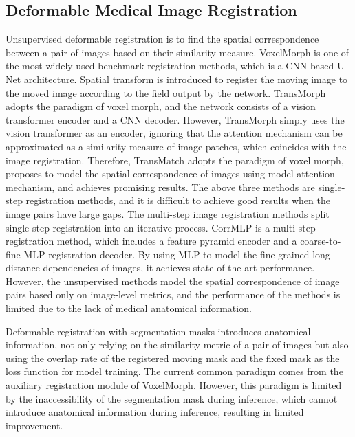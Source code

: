\subsection{Deformable Medical Image Registration}
Unsupervised deformable registration is to find the spatial correspondence between a pair of images based on their similarity measure.
VoxelMorph \cite{VoxelMorph} is one of the most widely used benchmark registration methods, which is a CNN-based U-Net architecture. Spatial transform is introduced to register the moving image to the moved image according to the field output by the network. 
TransMorph \cite{TransMorph} adopts the paradigm of voxel morph, and the network consists of a vision transformer encoder and a CNN decoder. However, TransMorph simply uses the vision transformer as an encoder, ignoring that the attention mechanism can be approximated as a similarity measure of image patches, which coincides with the image registration. Therefore, TransMatch \cite{TransMatch} adopts the paradigm of voxel morph, proposes to model the spatial correspondence of images using model attention mechanism, and achieves promising results.
The above three methods are single-step registration methods, and it is difficult to achieve good results when the image pairs have large gaps. The multi-step image registration methods split single-step registration into an iterative process. CorrMLP \cite{CorrMLP} is a multi-step registration method, which includes a feature pyramid encoder and a coarse-to-fine MLP registration decoder. By using MLP to model the fine-grained long-distance dependencies of images, it achieves state-of-the-art performance.
However, the unsupervised methods model the spatial correspondence of image pairs based only on image-level metrics, and the performance of the methods is limited due to the lack of medical anatomical information.

Deformable registration with segmentation masks introduces anatomical information, not only relying on the similarity metric of a pair of images but also using the overlap rate of the registered moving mask and the fixed mask as the loss function for model training. The current common paradigm comes from the auxiliary registration module of VoxelMorph. However, this paradigm is limited by the inaccessibility of the segmentation mask during inference, which cannot introduce anatomical information during inference, resulting in limited improvement.

